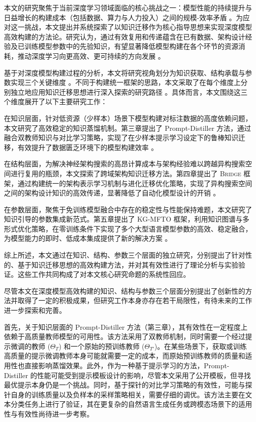 \documentclass[../main.tex]{subfiles}
\begin{document}
\label{sec:ch6-conclusion}


本文的研究聚焦于当前深度学习领域面临的核心挑战之一：模型性能的持续提升与日益增长的构建成本（包括数据、算力与人力投入）之间的规模-效率矛盾 。为应对这一挑战，本文提出并系统探索了以知识迁移作为核心指导思想来实现深度模型高效构建的方法论。研究认为，通过有效复用和传递蕴含在已有数据、架构设计经验及已训练模型参数中的先验知识，有望显著降低模型构建在各个环节的资源消耗，推动深度学习向更高效、更可持续的方向发展 。

基于对深度模型构建过程的分析，本文将研究视角划分为知识获取、结构承载与参数实现三个关键维度 。不同于构建统一框架的思路，本文采取了在每个维度上分别独立地应用知识迁移思想进行深入探索的研究路径 。具体而言，本文围绕这三个维度展开了以下主要研究工作：

在知识层面，针对低资源（少样本）场景下模型构建对标注数据的高度依赖问题，本文研究了高效稳定的知识蒸馏机制。第三章提出了 Prompt-Distiller 方法，通过融合双教师知识与对比学习策略，实现了在少样本提示学习设定下的鲁棒知识迁移，有效提升了数据匮乏环境下的模型构建效率 。

在结构层面，为解决神经架构搜索的高昂计算成本与架构经验难以跨越异构搜索空间进行复用的瓶颈，本文探索了跨域架构知识迁移方法。第四章提出了 \textsc{Bridge} 框架，通过构建统一的架构表示学习机制与进化迁移优化策略，实现了异构搜索空间之间的架构设计知识的高效传递，显著降低了自动化模型设计的开销 。

在参数层面，聚焦于免训练模型融合中存在的稳定性与性能保持难题，本文研究了知识引导的参数集成新范式。第五章提出了 KG-MFTO 框架，利用知识图谱与多形式优化策略，在零训练条件下实现了多个大型语言模型参数的高效、稳定融合，为模型能力的即时、低成本集成提供了新的解决方案 。

综上所述，本文通过在知识、结构、参数三个层面的独立研究，分别提出了针对性的、基于知识迁移思想的高效构建方法，并对其有效性进行了理论分析与实验验证。这些工作共同构成了对本文核心研究命题的系统性回应。


尽管本文在深度模型高效构建的知识、结构与参数三个层面分别提出了创新性的方法并取得了一定的积极成果，但研究工作本身亦存在若干局限性，有待未来的工作进一步探索和完善。

首先，关于知识层面的 Prompt-Distiller 方法（第三章），其有效性在一定程度上依赖于高质量教师模型的可用性。该方法采用了双教师机制，同时需要一个经过提示微调的教师 ($\Theta_T$) 和一个原始的预训练教师 ($\Theta_{T'}$)。在某些场景下，获取或训练高质量的提示微调教师本身可能就需要一定的成本，而原始预训练教师的质量和适用性也直接影响蒸馏效果。此外，作为一种基于提示学习的方法，Prompt-Distiller 的性能可能受到提示模板设计的影响，尽管本文采用了公开模板，但寻找最优提示本身仍是一个挑战。同时，基于探针的对比学习策略的有效性，可能与探针自身的训练质量以及负样本的采样策略相关，需要仔细的调优。该方法主要在文本分类任务上进行了验证，其在更复杂的自然语言生成任务或跨模态场景下的适用性与有效性尚待进一步考察。
\end{document}
